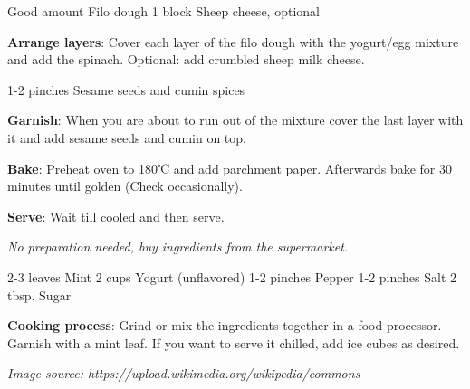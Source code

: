 \documentclass{article}
\begin{document}
\begin{step}
Good amount Filo dough
1 block Sheep cheese, optional

\method
\textbf{Arrange layers}: Cover each layer of the filo dough with the yogurt/egg mixture and add the spinach. Optional: add crumbled sheep milk cheese.
\end{step}

\begin{step}
1-2 pinches Sesame seeds and cumin spices

\method
\textbf{Garnish}: When you are about to run out of the mixture cover the last layer with it and add sesame seeds and cumin on top.

\textbf{Bake}: Preheat oven to 180℃ and add parchment paper. Afterwards bake for 30 minutes until golden (Check occasionally).

\textbf{Serve}: Wait till cooled and then serve.
\end{step}




\textit{No preparation needed, buy ingredients from the supermarket.}
\bigskip

\dishType{\drink}
\dishOther{\vegetarian}

\begin{step}
2-3 leaves Mint
2 cups Yogurt (unflavored)
1-2 pinches Pepper
1-2 pinches Salt
2 tbsp. Sugar

\method
\textbf{Cooking process}: Grind or mix the ingredients together in a food processor. Garnish with a mint leaf. If you want to serve it chilled, add ice cubes as desired.

\end{step}
\textit{Image source: https://upload.wikimedia.org/wikipedia/commons}
\end{document}
